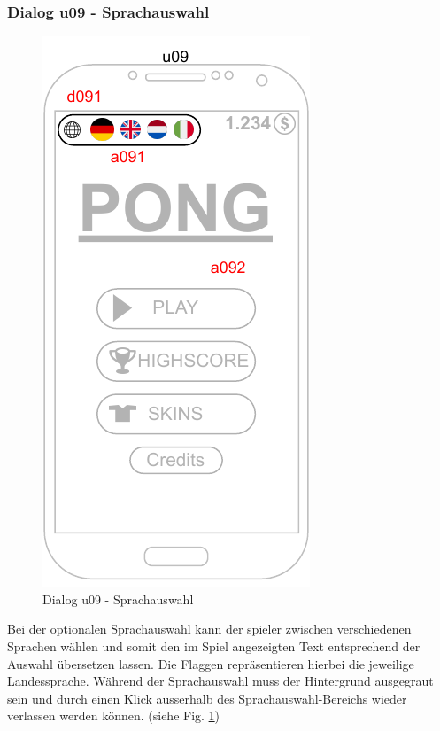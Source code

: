 \subsubsection{Dialog u09 - Sprachauswahl}\label{dialog:Sprachauswahl}

\begin{figure}[h!]
    \begin{center}
    \includegraphics[scale=1.4]{diagramme/pdf/Mockup-u09.pdf}
    \end{center}
    \caption{Dialog u09 - Sprachauswahl}\label{fig:dia:u09}
\end{figure}

Bei der optionalen Sprachauswahl kann der \gls{spieler} zwischen verschiedenen Sprachen wählen und somit den im Spiel angezeigten Text entsprechend der Auswahl übersetzen lassen.
Die Flaggen repräsentieren hierbei die jeweilige Landessprache. Während der Sprachauswahl muss der Hintergrund ausgegraut sein und durch einen Klick ausserhalb des Sprachauswahl-Bereichs wieder verlassen werden können.
(siehe Fig. \ref{fig:dia:u09})
\clearpage

